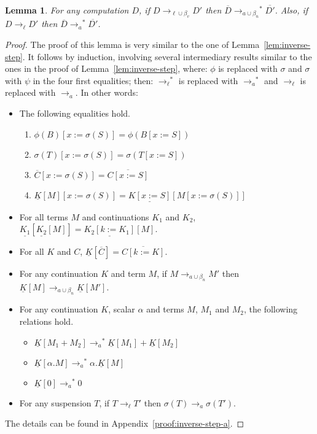 \documentclass{LMCS}
\newtheorem{lemma}[theorem]{Lemma}
\newcommand{\App}[1]{The details can be found in Appendix~\ref{proof:#1}}
\newcommand{\xto}[1]{\ensuremath{\rightarrow_{#1}}}
\newcommand{\tolinred}{\xto{\ell}}
\newcommand{\toalgred}{\xto{a}}
\newcommand{\stoalgred}{\ensuremath{\xto{a}^{\ast}}}
\newcommand{\stolinred}{\ensuremath{\xto{\ell}^{\ast}}}
\newcommand{\toblinred}{\xto{\ell\cup\beta_v}}
\newcommand{\tobalgred}{\xto{a\cup\beta_n}}
\newcommand{\stobalgred}{\ensuremath{\xto{a\cup\beta_n}^{\ast}}}
\begin{document}
\begin{lemma}
  \label{lem:inverse-step-a} For any computation $D$, if $D\toblinred D'$
  then $\overline{D}\stobalgred\overline{D'}$. Also, if $D\tolinred D'$
  then $\overline{D}\stoalgred\overline{D'}$.
\end{lemma}
\begin{proof}
  The proof of this lemma is very similar to the one of
  Lemma~\ref{lem:inverse-step}. It follows by induction, involving several
  intermediary results similar to the ones in the proof of
  Lemma~\ref{lem:inverse-step}, where: $\phi$ is replaced with
  $\sigma$ and $\sigma$ with $\psi$ in the four first equalities; then:
  $\stolinred$ is replaced with $\stoalgred$ and $\tolinred$ is
  replaced with $\toalgred$. In other words:
  \begin{itemize}
    \item  The following equalities hold.
      \begin{enumerate}
	\item {$\phi(B)[x:=\sigma(S)]=\phi(B[x:=S])$}
	\item $\sigma(T)[x:=\sigma(S)]=\sigma(T[x:=S])$
	\item {$\overline{C}[x:=\sigma(S)]=\overline{C[x:=S]}$}
	\item $\underline{K}[M][x:=\sigma(S)]=\underline{K[x:=S]}[M[x:=\sigma(S)]]$
      \end{enumerate}
    \item For all terms $M$ and continuations
      $K_{1}$ and $K_{2}$, 
      $\underline{K_{1}}[\underline{K_{2}}[M]]=\underline{K_{2}[k:=K_{1}]}[M]$.
    \item For all $K$ and
      $C$, $\underline{K}[\overline{C}]=\overline{C[k:=K]}$.
    \item For any continuation $K$ and term
      $M$, if $M\tobalgred M'$ then $\underline{K}[M]\tobalgred\underline{K}[M']$.
    \item For any continuation $K$, scalar $\alpha$ and terms $M$, $M_1$
      and $M_2$, the following relations hold.
      \begin{itemize}
	\item $\underline{K}[M_{1}+M_{2}]\stoalgred\underline{K}[M_{1}]+\underline{K}[M_{2}]$
	\item $\underline{K}[\alpha.M]\stoalgred\alpha.\underline{K}[M]$
	\item $\underline{K}[0]\stoalgred0$
      \end{itemize}
    \item For any suspension $T$, if $T\tolinred T'$
      then $\sigma(T)\toalgred\sigma(T')$.
  \end{itemize}
  \App{inverse-step-a}.
\end{proof}
\end{document}
